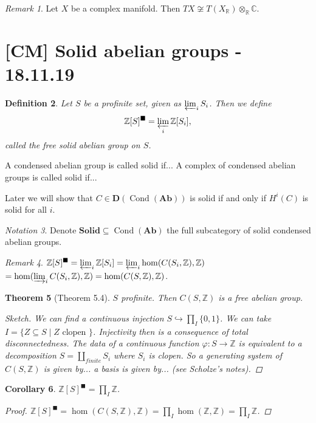\documentclass[12pt]{article}
\theoremstyle{darkgreentheorem}
\newtheorem{thm}{Theorem}[section]
\newtheorem{cor}[thm]{Corollary}
\theoremstyle{darkbluedefinition}
\newtheorem{defn}[thm]{Definition}
\theoremstyle{darkredexample}
\theoremstyle{remark}
\newtheorem{rem}[thm]{Remark}
\newtheorem{nota}[thm]{Notation}
\newcommand{\Z}{\mathbb{Z}}
\newcommand{\R}{\mathbb{R}}
\newcommand{\1}{\mathbbm{1}}
\newcommand{\C}{\mathbb{C}}
\newcommand{\Ab}{\mathbf{Ab}}
\newcommand{\D}{\mathbf{D}}
\newcommand{\Solid}{\mathbf{Solid}}
\DeclareMathOperator{\Cond}{Cond}
\newcommand{\ot}{\otimes}
\newcommand{\sub}{\subseteq}
\newcommand{\mono}{\hookrightarrow}
\newcommand{\solid}{^{\blacksquare}}
\begin{document}
\begin{rem}
    Let $X$ be a complex manifold.
    Then $TX\not\cong T(X_{\R})\ot_{\R}\C$.
\end{rem}

\section{[CM] Solid abelian groups - 18.11.19}

\begin{defn}
    Let $S$ be a profinite set, given as $\varprojlim_{i} S_{i}$.
    Then we define
    \[ \Z[S]\solid=\varprojlim_{i}\Z[S_{i}],\]
    called the free solid abelian group on $S$.
\end{defn}

A condensed abelian group is called solid if...
A complex of condensed abelian groups is called solid if...

Later we will show that $C\in \D(\Cond(\Ab))$ is solid if and only if $H^{i}(C)$ is solid for all $i$.

\begin{nota}
    Denote $\Solid\sub \Cond(\Ab)$ the full subcategory of solid condensed abelian groups.
\end{nota}

\begin{rem}
    $\Z[S]\solid=\varprojlim_{i}\Z[S_{i}]=\varprojlim_{i}\hom(C(S_{i},\Z),\Z)$$=\hom(\varinjlim_{i}C(S_{i},\Z),\Z)=\hom(C(S,\Z),\Z)$.
\end{rem}

\begin{thm}[Theorem 5.4]
    $S$ profinite.
    Then $C(S,\Z)$ is a free abelian group.
    \begin{proof}[Sketch]
	We can find a continuous injection $S\mono \prod_{I}\{0,1\}$.
	We can take $I=\{ Z \sub S\mid Z\text{ clopen }\}$.
	Injectivity then is a consequence of total disconnectedness.
	The data of a continuous function $\varphi\colon S\to \Z$ is equivalent to a decomposition $S=\coprod_{finite}S_{i}$ where $S_{i}$ is clopen.
	So a generating system of $C(S,\Z)$ is given by... a basis is given by... (see Scholze's notes).
    \end{proof}
\end{thm}

\begin{cor}
    $\Z[S]\solid=\prod_{I}\Z$.
    \begin{proof}
	$\Z[S]\solid=\hom(C(S,\Z),\Z)=\prod_{I}\hom(\Z,\Z)=\prod_{I}\Z$.
    \end{proof}
\end{cor}
\end{document}
